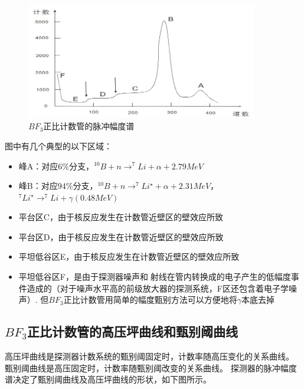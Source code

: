 \documentclass[a4paper,UTF8]{ctexart}
\begin{document}
\begin{figure}[H]
    \centering
    \begin{minipage}[b]{0.9\textwidth}
        \centering
        \includegraphics[width=0.9\textwidth]{./fig1.jpg}
        \caption{$BF_3$正比计数管的脉冲幅度谱}
    \end{minipage}
\end{figure}

图中有几个典型的以下区域：

\begin{itemize}
    \item 峰A：对应$6\%$分支，$^{10}B + n \rightarrow ^{7}Li + \alpha + 2.79MeV $
    \item 峰B：对应$94\%$分支，$^{10}B + n \rightarrow ^{7}Li^{\star} + \alpha + 2.31MeV $，$^{7}Li^{\star} \rightarrow ^{7}Li + \gamma(0.48MeV)$
    \item 平台区C，由于核反应发生在计数管近壁区的壁效应所致
    \item 平台区D，由于核反应发生在计数管近壁区的壁效应所致
    \item 平坦低谷区E，由于核反应发生在计数管近壁区的壁效应所致
    \item 平坦低谷区F，是由于探测器噪声和射线在管内转换成的电子产生的低幅度事件造成的（对于噪声水平高的前级放大器的探测系统，F区还包含着电子学噪声）.
    但$BF_3$正比计数管用简单的幅度甄别方法可以方便地将$\gamma$本底去掉
\end{itemize}

\subsection{$BF_3$正比计数管的高压坪曲线和甄别阈曲线}

高压坪曲线是探测器计数系统的甄别阈固定时，计数率随高压变化的关系曲线。
甄别阈曲线是高压固定时，计数率随甄别阈改变的关系曲线。
探测器的脉冲幅度谱决定了甄别阈曲线及高压坪曲线的形状，如下图所示。
\end{document}
